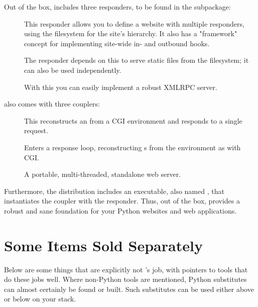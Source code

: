 Out of the box,  includes three responders, to be found in the
 subpackage:

\begin{description}

\item[]
    {This responder allows you to define a website with multiple responders,
    using the filesystem for the site's hierarchy. It also has a "framework"
    concept for implementing site-wide in- and outbound hooks.}

\item[]
    {The  responder depends on this to serve static files from
    the filesystem; it can also be used independently.}

\item[]
    {With this you can easily implement a robust XMLRPC server.}

\end{description}


 also comes with three couplers:

\begin{description}

\item[]
    {This reconstructs an  from a CGI environment and
    responds to a single request.}

\item[]
    {Enters a response loop, reconstructing s from the
    environment as with CGI.}

\item[]
    {A portable, multi-threaded, standalone web server.}

\end{description}


Furthermore, the  distribution includes an executable, also named
, that instantiates the  coupler with the
 responder. Thus, out of the box,  provides a
robust and sane foundation for your Python websites and web applications.


\section{Some Items Sold Separately \label{sold-separately}}

Below are some things that are explicitly not 's job, with
pointers to tools that do these jobs well. Where non-Python tools are mentioned,
Python substitutes can almost certainly be found or built. Such substitutes can
be used either above or below  on your stack.

